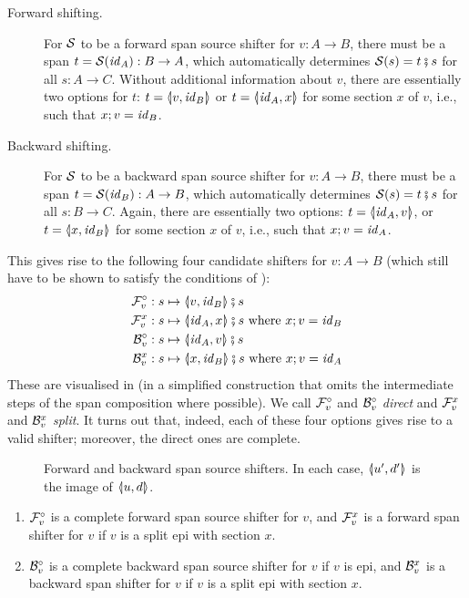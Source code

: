 %
\begin{description}
\item[Forward shifting.] For $\cS$ to be a forward span source shifter for $v:A\to B$, there must be a span $t=\cS(\id_A):B\to A$, which automatically determines $\cS(s)=t\spcomp s$ for all $s:A\to C$. Without additional information about $v$, there are essentially two options for $t$: $t=\spanof{v}{\id_B}$ or $t=\spanof{\id_A}{x}$ for some section $x$ of $v$, i.e., such that $x;v=\id_B$.

\item[Backward shifting.] For $\cS$ to be a backward span source shifter for $v:A\to B$, there must be a span $t=\cS(\id_B):A\to B$, which automatically determines $\cS(s)=t \spcomp s$ for all $s:B\to C$. Again, there are essentially two options: $t=\spanof{\id_A}{v}$, or $t=\spanof{x}{\id_B}$ for some section $x$ of $v$, i.e., such that $x;v=\id_A$.
\end{description}
%
This gives rise to the following four candidate shifters for $v:A\to B$ (which still have to be shown to satisfy the conditions of ):
%
\begin{align*}
\dF v & : s \mapsto \spanof{v}{\id_B}\spcomp s \\
\rF v x& : s \mapsto \spanof{\id_A}{x}\spcomp s \text{ where $x;v=\id_B$} \\
\dB v& : s \mapsto \spanof{\id_A}{v}\spcomp s \\
\rB v x& : s \mapsto \spanof{x}{\id_B}\spcomp s \text{ where $x;v=\id_A$}
\end{align*}
%
These are visualised in  (in a simplified construction that omits the intermediate steps of the span composition where possible). We call $\dF v$ and $\dB v$ \emph{direct} and $\rF v x$ and $\rB v x$ \emph{split}. It turns out that, indeed, each of these four options gives rise to a valid shifter; moreover, the direct ones are complete.
%
\begin{figure}[t]
\centering

\caption{Forward and backward span source shifters. In each case, $\spanof{u'}{d'}$ is the image of $\spanof{u}{d}$.}
\end{figure}
%
\begin{proposition}
\begin{enumerate}[topsep=\smallskipamount]
\item $\cF_v^\circ$ is a complete forward span source shifter for $v$, and $\cF_v^x$ is a forward span shifter for $v$ if $v$ is a split epi with section $x$.
\item $\cB_v^\circ$ is a complete backward span source shifter for $v$ if $v$ is epi, and $\cB_v^x$ is a backward span shifter for $v$ if $v$ is a split epi with section $x$.
\end{enumerate}
\end{proposition}
